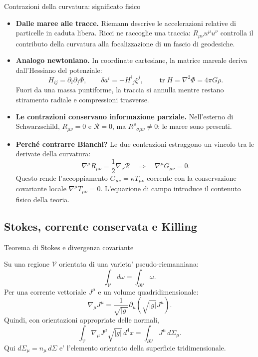 \begin{frame}[t]{Contrazioni della curvatura: significato fisico}
\small\raggedright
\begin{itemize}
\item \textbf{Dalle maree alle tracce.}
Riemann descrive le accelerazioni relative di particelle in caduta libera.
Ricci ne raccoglie una traccia: $R_{\mu\nu}u^\mu u^\nu$ controlla
il contributo della curvatura alla focalizzazione di un fascio di geodesiche.

\item \textbf{Analogo newtoniano.}
In coordinate cartesiane, la matrice mareale deriva dall'Hessiano del potenziale:
\[
H_{ij}=\partial_i\partial_j\Phi,\qquad
\delta a^i=-H^i{}_j\xi^j,\qquad
\operatorname{tr}H=\nabla^2\Phi=4\pi G\rho.
\]
Fuori da una massa puntiforme, la traccia si annulla mentre restano
stiramento radiale e compressioni trasverse.

\item \textbf{Le contrazioni conservano informazione parziale.}
Nell'esterno di Schwarzschild, $R_{\mu\nu}=0$ e $\mathcal R=0$,
ma $R^\rho{}_{\sigma\mu\nu}\ne0$: le maree sono presenti.

\item \textbf{Perch\'e contrarre Bianchi?}
Le due contrazioni estraggono un vincolo tra le derivate della curvatura:
\[
\nabla^\mu R_{\mu\nu}=\frac12\nabla_\nu\mathcal R
\quad\Longrightarrow\quad
\boxed{\nabla^\mu G_{\mu\nu}=0}.
\]
Questo rende l'accoppiamento $G_{\mu\nu}=\kappa T_{\mu\nu}$
coerente con la conservazione covariante locale
$\nabla^\mu T_{\mu\nu}=0$.
L'equazione di campo introduce il contenuto fisico della teoria.
\end{itemize}
\end{frame}

\subsection{Stokes, corrente conservata e Killing}

\begin{frame}[t]{Teorema di Stokes e divergenza covariante}\small\raggedright

Su una regione $\mathcal V$ orientata di una varieta' pseudo-riemanniana:
\[
\int_{\mathcal V}d\omega=\int_{\partial\mathcal V}\omega.
\]
Per una corrente vettoriale $J^\mu$ e un volume quadridimensionale:
\[
\nabla_\mu J^\mu=\frac{1}{\sqrt{|g|}}\partial_\mu(\sqrt{|g|}J^\mu).
\]
Quindi, con orientazioni appropriate delle normali,
\[
\int_{\mathcal V}\nabla_\mu J^\mu\sqrt{|g|}\,d^4x
=\int_{\partial\mathcal V}J^\mu\,d\Sigma_\mu.
\]
Qui $d\Sigma_\mu=n_\mu\,d\Sigma$ e' l'elemento orientato della superficie tridimensionale.

\end{frame}

